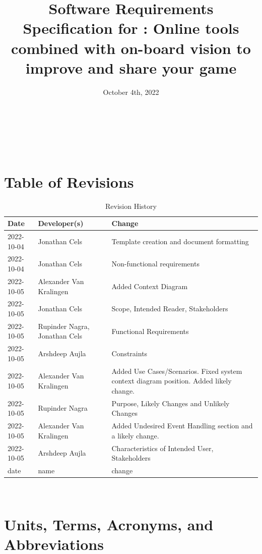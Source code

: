 \documentclass[12pt]{article}
\begin{document}
\title{Software Requirements Specification for \progname{}: Online tools combined with on-board vision to improve and share your game} 
\author{\authname}
\date{October 4th, 2022}
	
\maketitle

~\newpage

\tableofcontents

~\newpage

\section*{Table of Revisions}
\begin{table}[hp]
\caption{Revision History} \label{TblRevisionHistory}
\begin{tabularx}{\textwidth}{llX}
\toprule
\textbf{Date} & \textbf{Developer(s)} & \textbf{Change}\\
\midrule
2022-10-04 & Jonathan Cels & Template creation and document formatting\\ 
2022-10-04 & Jonathan Cels & Non-functional requirements\\
2022-10-05 & Alexander Van Kralingen & Added Context Diagram\\
2022-10-05 & Jonathan Cels & Scope, Intended Reader, Stakeholders\\
2022-10-05 & Rupinder Nagra, Jonathan Cels & Functional Requirements\\
2022-10-05 & Arshdeep Aujla & Constraints\\
2022-10-05 & Alexander Van Kralingen & Added Use Cases/Scenarios. Fixed system context diagram position. Added likely change.\\
2022-10-05 & Rupinder Nagra & Purpose, Likely Changes and Unlikely Changes\\
2022-10-05 & Alexander Van Kralingen & Added Undesired Event Handling section and a likely change.\\
2022-10-05 & Arshdeep Aujla & Characteristics of Intended User, Stakeholders\\
date & name & change\\
\bottomrule
\end{tabularx}
\end{table}

~\newpage

\section{Units, Terms, Acronyms, and Abbreviations}
\end{document}
